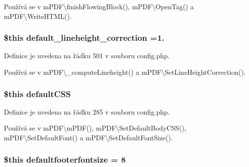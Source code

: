 Používá se v m\-P\-D\-F\textbackslash{}finish\-Flowing\-Block(), m\-P\-D\-F\textbackslash{}\-Open\-Tag() a m\-P\-D\-F\textbackslash{}\-Write\-H\-T\-M\-L().

\hypertarget{config_8php_aab4a33eb2b243a7ffdebd0f48edf18d5}{
\subsubsection[{default\-\_\-lineheight\-\_\-correction}]{\setlength{\rightskip}{0pt plus 5cm}\$this default\-\_\-lineheight\-\_\-correction =1.}}\label{config_8php_aab4a33eb2b243a7ffdebd0f48edf18d5}


Definice je uvedena na řádku 501 v souboru config.\-php.



Používá se v m\-P\-D\-F\textbackslash{}\-\_\-compute\-Lineheight() a m\-P\-D\-F\textbackslash{}\-Set\-Line\-Height\-Correction().

\hypertarget{config_8php_adc1dd9449d51b8099d382dd3e1fc568e}{
\subsubsection[{default\-C\-S\-S}]{\setlength{\rightskip}{0pt plus 5cm}\$this default\-C\-S\-S}}\label{config_8php_adc1dd9449d51b8099d382dd3e1fc568e}


Definice je uvedena na řádku 285 v souboru config.\-php.



Používá se v m\-P\-D\-F\textbackslash{}m\-P\-D\-F(), m\-P\-D\-F\textbackslash{}\-Set\-Default\-Body\-C\-S\-S(), m\-P\-D\-F\textbackslash{}\-Set\-Default\-Font() a m\-P\-D\-F\textbackslash{}\-Set\-Default\-Font\-Size().

\hypertarget{config_8php_ab8d89980f561d7b226fddbef8cf3c90e}{
\subsubsection[{defaultfooterfontsize}]{\setlength{\rightskip}{0pt plus 5cm}\$this defaultfooterfontsize = 8}}\label{config_8php_ab8d89980f561d7b226fddbef8cf3c90e}


